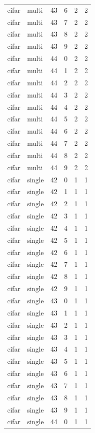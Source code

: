 \begin{tabular}{llrrrr}
cifar & multi & 43 & 6 & 2 & 2 \\
cifar & multi & 43 & 7 & 2 & 2 \\
cifar & multi & 43 & 8 & 2 & 2 \\
cifar & multi & 43 & 9 & 2 & 2 \\
cifar & multi & 44 & 0 & 2 & 2 \\
cifar & multi & 44 & 1 & 2 & 2 \\
cifar & multi & 44 & 2 & 2 & 2 \\
cifar & multi & 44 & 3 & 2 & 2 \\
cifar & multi & 44 & 4 & 2 & 2 \\
cifar & multi & 44 & 5 & 2 & 2 \\
cifar & multi & 44 & 6 & 2 & 2 \\
cifar & multi & 44 & 7 & 2 & 2 \\
cifar & multi & 44 & 8 & 2 & 2 \\
cifar & multi & 44 & 9 & 2 & 2 \\
cifar & single & 42 & 0 & 1 & 1 \\
cifar & single & 42 & 1 & 1 & 1 \\
cifar & single & 42 & 2 & 1 & 1 \\
cifar & single & 42 & 3 & 1 & 1 \\
cifar & single & 42 & 4 & 1 & 1 \\
cifar & single & 42 & 5 & 1 & 1 \\
cifar & single & 42 & 6 & 1 & 1 \\
cifar & single & 42 & 7 & 1 & 1 \\
cifar & single & 42 & 8 & 1 & 1 \\
cifar & single & 42 & 9 & 1 & 1 \\
cifar & single & 43 & 0 & 1 & 1 \\
cifar & single & 43 & 1 & 1 & 1 \\
cifar & single & 43 & 2 & 1 & 1 \\
cifar & single & 43 & 3 & 1 & 1 \\
cifar & single & 43 & 4 & 1 & 1 \\
cifar & single & 43 & 5 & 1 & 1 \\
cifar & single & 43 & 6 & 1 & 1 \\
cifar & single & 43 & 7 & 1 & 1 \\
cifar & single & 43 & 8 & 1 & 1 \\
cifar & single & 43 & 9 & 1 & 1 \\
cifar & single & 44 & 0 & 1 & 1 \\

\end{tabular}
